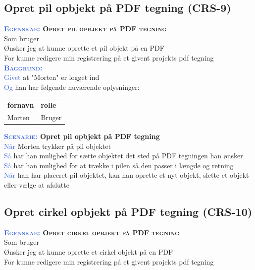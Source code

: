 \subsection{Opret pil opbjekt på PDF tegning (CRS-9)} \label{sec:USOpretPilObjekt}
\textbf{\textsc{\textcolor{RoyalBlue}{Egenskab:} Opret pil opbjekt på PDF tegning}}\\
Som bruger\\
Ønsker jeg at kunne oprette et pil objekt på en PDF\\
For kunne redigere min registrering på et givent projekts pdf tegning\\

\textsc{\textcolor{RoyalBlue}{\textbf{Baggrund:}}}\\
\textcolor{RoyalBlue}{Givet} at "Morten" er logget ind\\
\textcolor{RoyalBlue}{Og} han har følgende nuværende oplysninger:\\
\begin{tabular}{| l | l |}
	\textbf{fornavn} & \textbf{rolle} \\
	Morten & Bruger\\
\end{tabular}

\textbf{\textsc{\textcolor{RoyalBlue}{Scenarie:}} Opret pil opbjekt på PDF tegning}\\
\textcolor{RoyalBlue}{Når} Morten trykker på pil objektet\\
\textcolor{RoyalBlue}{Så}  har han mulighed for sætte objektet det sted på PDF tegningen han ønsker\\
\textcolor{RoyalBlue}{Så}  har han mulighed for at trække i pilen så den passer i længde og retning\\
\textcolor{RoyalBlue}{Når} han har placeret pil objektet, kan han oprette et nyt objekt, slette et objekt eller vælge at afslutte \\

\subsection{Opret cirkel opbjekt på PDF tegning (CRS-10)} \label{sec:USOpretCirkelObjekt}
\textbf{\textsc{\textcolor{RoyalBlue}{Egenskab:} Opret cirkel opbjekt på PDF tegning}}\\
Som bruger\\
Ønsker jeg at kunne oprette et cirkel objekt på en PDF\\
For kunne redigere min registrering på et givent projekts pdf tegning\\

